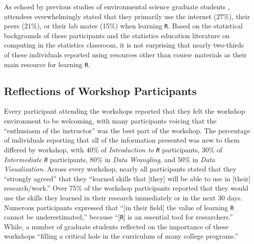 \documentclass[12pt]{article}
\begin{document}
\quad As echoed by previous studies of environmental science graduate students
\citep{datacarpentry, theobold}, attendees overwhelmingly stated that they
primarily use the internet (27\%), their peers (21\%), or their lab mates (15\%) 
when learning \texttt{R}. Based on the statistical backgrounds of these
participants and the statistics education literature on computing in the
statistics classroom, it is not surprising that nearly two-thirds of these 
individuals reported using resources other than course materials as their main 
resource for learning \texttt{R}. 

\subsection{Reflections of Workshop Participants} 

\quad Every participant attending the workshops reported that they felt the
workshop environment to be welcoming, with many participants voicing that the
``enthusiasm of the instructor'' was the best part of the workshop. The
percentage of individuals reporting that all of the information presented was 
new to them differed by workshop, with 40\% of \emph{Introduction to \texttt{R}}
participants, 30\% of \emph{Intermediate \texttt{R}} participants, 80\% in 
\emph{Data Wrangling}, and 50\% in \emph{Data Visualization}. Across every
workshop, nearly all participants stated that they ``strongly agreed'' that they
``learned skills that [they] will be able to use in [their] research/work.'' 
Over 75\% of the workshop participants reported that they would use the skills
they learned in their research immediately or in the next 30 days. Numerous
participants expressed that ``[in their field] the value of learning \texttt{R}
cannot be underestimated,'' because ``[\texttt{R}] is an essential tool for
researchers.'' While, a number of graduate students reflected on the importance
of these workshops ``filling a critical hole in the curriculum of many college
programs.''
 
\end{document}
